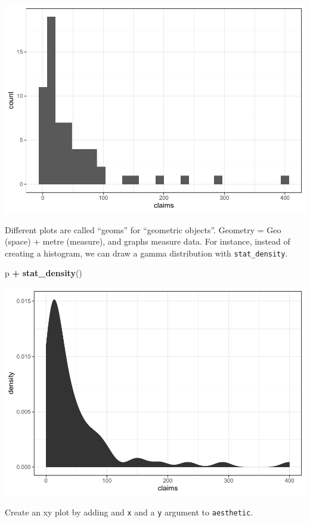 \documentclass[openany]{book}
\newenvironment{Shaded}{\begin{snugshade}}{\end{snugshade}}
\newcommand{\KeywordTok}[1]{\textcolor[rgb]{0.13,0.29,0.53}{\textbf{#1}}}
\newcommand{\NormalTok}[1]{#1}
\newcommand{\OperatorTok}[1]{\textcolor[rgb]{0.81,0.36,0.00}{\textbf{#1}}}
\newcommand{\StringTok}[1]{\textcolor[rgb]{0.31,0.60,0.02}{#1}}
\begin{document}
\includegraphics{04-visualization_files/figure-latex/unnamed-chunk-4-1.pdf}

Different plots are called ``geoms'' for ``geometric objects''. Geometry = Geo (space) + metre (measure), and graphs measure data. For instance, instead of creating a histogram, we can draw a gamma distribution with \texttt{stat\_density}.

\begin{Shaded}
\begin{Highlighting}[]
\NormalTok{p }\OperatorTok{+}\StringTok{ }\KeywordTok{stat_density}\NormalTok{()}
\end{Highlighting}
\end{Shaded}

\includegraphics{04-visualization_files/figure-latex/unnamed-chunk-5-1.pdf}

Create an xy plot by adding and \texttt{x} and a \texttt{y} argument to \texttt{aesthetic}.
\end{document}
